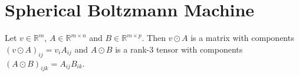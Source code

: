 \documentclass[12pt]{article}
\theoremstyle{definition}%
\theoremstyle{definition}
\theoremstyle{remark}
\begin{document}

\section{Spherical Boltzmann Machine}
Let $v \in \mathbb{R}^m$, $A \in \mathbb{R}^{m \times n}$ and $B \in \mathbb{R}^{m \times p}$. Then $v \odot A$ is a matrix with components $(v \odot A)_{ij} = v_i A_{ij}$ and $ A \odot B$ is a rank-3 tensor with components $(A\odot B)_{ijk} = A_{ij} B_{ik}$.
\end{document}
